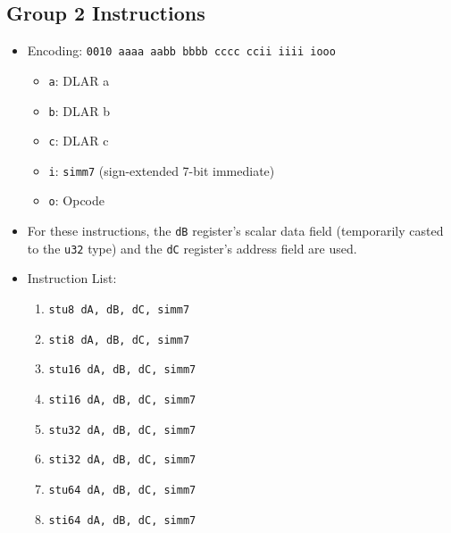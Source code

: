 \documentclass{article}
\begin{document}
	\subsection{Group 2 Instructions}
		\begin{itemize}
		\item Encoding: \texttt{0010 aaaa aabb bbbb  cccc ccii iiii iooo}
			\begin{itemize}
			\item \texttt{a}:  DLAR a
			\item \texttt{b}:  DLAR b
			\item \texttt{c}:  DLAR c
			\item \texttt{i}:  \texttt{simm7} (sign-extended 7-bit
			immediate)
			\item \texttt{o}:  Opcode
			\end{itemize}

		\item For these instructions, the \texttt{dB} register's scalar
		data field (temporarily casted to the \texttt{u32} type) and the
		\texttt{dC} register's address field are used. 

		\item Instruction List:
			\begin{enumerate}
			\item \texttt{stu8 dA, dB, dC, simm7}
			\item \texttt{sti8 dA, dB, dC, simm7}
			\item \texttt{stu16 dA, dB, dC, simm7}
			\item \texttt{sti16 dA, dB, dC, simm7}
			\item \texttt{stu32 dA, dB, dC, simm7}
			\item \texttt{sti32 dA, dB, dC, simm7}
			\item \texttt{stu64 dA, dB, dC, simm7}
			\item \texttt{sti64 dA, dB, dC, simm7}
			\end{enumerate}
		\end{itemize}
		\newpage
\end{document}
